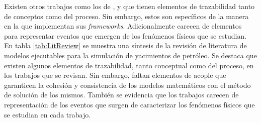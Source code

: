 Existen otros trabajos como los de \cite{Cao2002}, \cite{DeBaun2005} y \cite{ZHANG2007135} que tienen elementos de trazabilidad tanto de conceptos como del proceso. Sin embargo, estos son específicos de la manera en la que implementan sus \textit{frameworks}. Adicionalmente carecen de elementos para representar eventos que emergen de los fenómenos físicos que se estudian.\\

En tabla \ref{tab:LitReview} se muestra una síntesis de la revisión de literatura de modelos ejecutables para la simulación de yacimientos de petróleo. Se destaca que existen algunos elementos de trazabilidad, tanto conceptual como del proceso, en los trabajos que se revisan. Sin embargo, faltan elementos de acople que garanticen la cohesión y consistencia de los modelos matemáticos con el método de solución de los mismos. También se evidencia que los trabajos carecen de representación de los eventos que surgen de caracterizar los fenómenos físicos que se estudian en cada trabajo. \\

